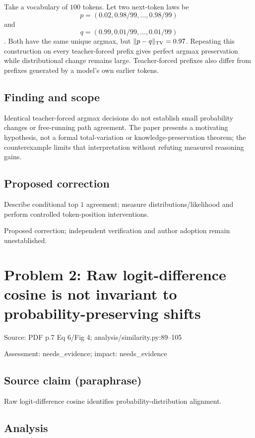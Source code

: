 \documentclass[11pt]{article}
\begin{document}
Take a vocabulary of \(100\) tokens. Let two next-token laws be \[p=(0.02,0.98/99,\ldots,0.98/99)\] and \[q=(0.99,0.01/99,\ldots,0.01/99)\]. Both have the same unique argmax, but \(\|p-q\|_{\rm TV}=0.97\). Repeating this construction on every teacher-forced prefix gives perfect argmax preservation while distributional change remains large. Teacher-forced prefixes also differ from prefixes generated by a model's own earlier tokens.

\subsection*{Finding and scope}

Identical teacher-forced argmax decisions do not establish small probability changes or free-running path agreement. The paper presents a motivating hypothesis, not a formal total-variation or knowledge-preservation theorem; the counterexample limits that interpretation without refuting measured reasoning gains.

\subsection*{Proposed correction}

Describe conditional top \(1\) agreement; measure distributions/likelihood and perform controlled token-position interventions.

Proposed correction; independent verification and author adoption remain unestablished.

\section*{Problem 2: Raw logit-difference cosine is not invariant to probability-preserving shifts}

Source: PDF p.7 Eq 6/Fig 4; analysis/similarity.py:89–105

Assessment: needs\_evidence; impact: needs\_evidence

\subsection*{Source claim (paraphrase)}

Raw logit-difference cosine identifies probability-distribution alignment.

\subsection*{Analysis}
\end{document}
